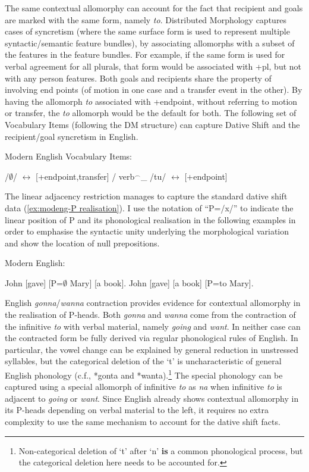 	The same contextual allomorphy can account for the fact that recipient and goals are marked with the same form, namely \textit{to}. Distributed Morphology \citep{Halle.1993} captures cases of syncretism (where the same surface form is used to represent multiple syntactic/semantic feature bundles), by associating allomorphs with a subset of the features in the feature bundles. For example, if the same form is used for verbal agreement for all plurals, that form would be associated with +pl, but not with any person features. Both goals and recipients share the property of involving end points (of motion in one case and a transfer event in the other). By having the allomorph \textit{to} associated with +endpoint, without referring to motion or transfer, the \textit{to} allomorph would be the default for both. The following set of Vocabulary Items (following the DM structure) can capture Dative Shift and the recipient/goal syncretism in English.

	\begin{exe}
		\ex Modern English Vocabulary Items:\label{ex:mevi}
		\begin{xlist}
			\ex /$\emptyset$/ $\leftrightarrow$ [+endpoint,transfer] / verb$^{\smallfrown}$\_
			\ex /tu/ $\leftrightarrow$ [+endpoint]
		\end{xlist}
	\end{exe}

	The linear adjacency restriction manages to capture the standard dative shift data (\ref{ex:modeng-P realisation}). I use the notation of ``P=/x/'' to indicate the linear position of P and its phonological realisation in the following examples in order to emphasise the syntactic unity underlying the morphological variation and show the location of null prepositions.
	\begin{exe}
		\ex Modern English:\label{ex:modeng-P realisation}
		\begin{xlist}
	\ex John [gave] [P=$\emptyset$ Mary] [a book].
	\ex John [gave] [a book] [P=to Mary].
\end{xlist}
	\end{exe}

	English \textit{gonna}/\textit{wanna} contraction provides evidence for contextual allomorphy in the realisation of P-heads. Both \textit{gonna} and \textit{wanna} come from the contraction of the infinitive \textit{to} with verbal material, namely \textit{going} and \textit{want}. In neither case can the contracted form be fully derived via regular phonological rules of English. In particular, the vowel change can be explained by general reduction in unstressed syllables, but the categorical deletion of the `t' is uncharacteristic of general English phonology (c.f., *gonta and *wanta).\footnote{Non-categorical deletion of `t' after `n' \textbf{is} a common phonological process, but the categorical deletion here needs to be accounted for.} The special phonology can be captured using a special allomorph of infinitive \textit{to} as \textit{na} when infinitive \textit{to} is adjacent to \textit{going} or \textit{want}. Since English already shows contextual allomorphy in its P-heads depending on verbal material to the left, it requires no extra complexity to use the same mechanism to account for the dative shift facts.

